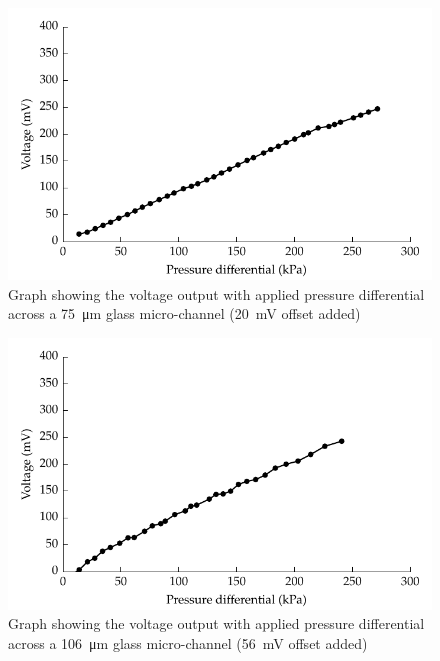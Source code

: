       \begin{figure}
          \centering
          \includegraphics{content/pt1/01-PowerHarvesting/graphics/streamingCell_voltVsPress_75um_out}
          \caption{\label{fig:VvsP_75um}Graph showing the voltage output with applied pressure differential across a \SI{75}{\micro\metre} glass micro-channel (\SI{20}{\milli\volt} offset added)}
      \end{figure}

      \begin{figure}
          \centering
          \includegraphics{content/pt1/01-PowerHarvesting/graphics/streamingCell_voltVsPress_106um_out}
          \caption{\label{fig:VvsP_106um}Graph showing the voltage output with applied pressure differential across a \SI{106}{\micro\metre} glass micro-channel (\SI{56}{\milli\volt} offset added)}
      \end{figure}

